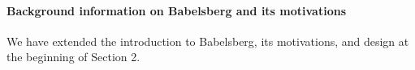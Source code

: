 \documentclass[10pt,twocolumn]{article}
\providecommand{\DIFaddtex}[1]{{\protect\color{BLUE}\uline{#1}}} %
\providecommand{\DIFaddbegin}{} %
\providecommand{\DIFaddend}{} %
\providecommand{\DIFadd}[1]{\texorpdfstring{\DIFaddtex{#1}}{#1}} %
\begin{document}
\paragraph{Background information on Babelsberg and its motivations}
We have extended the introduction to Babelsberg, its motivations, and
design at the beginning of Section 2.

\end{document}
